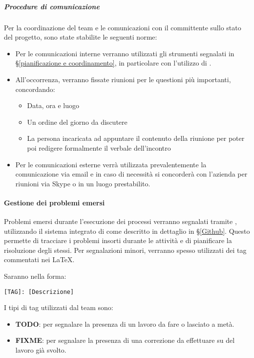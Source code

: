 			\subparagraph{Procedure di comunicazione}
			Per la coordinazione del team e le comunicazioni con il committente sullo stato del progetto, sono state stabilite le seguenti norme:
			\begin{itemize}
				\item Per le comunicazioni interne verranno utilizzati gli strumenti segnalati in \S\ref{pianificazione e coordinamento}, in particolare con l'utilizzo di .
				\item All'occorrenza, verranno fissate riunioni per le questioni più importanti, concordando:
					\begin{itemize}
						\item Data, ora e luogo
						\item Un ordine del giorno da discutere
						\item La persona incaricata ad appuntare il contenuto della riunione per poter poi redigere formalmente il verbale dell'incontro
					\end{itemize}
				\item Per le comunicazioni esterne verrà utilizzata prevalentemente la comunicazione via email e in caso di necessità si concorderà con l'azienda per riunioni via Skype o in un luogo prestabilito. %
			\end{itemize}


    		\paragraph{Gestione dei problemi emersi}
			Problemi emersi durante l'esecuzione dei processi verranno segnalati tramite , utilizzando il sistema integrato di  come descritto in dettaglio in \S\ref{Github}. Questo permette di tracciare i problemi insorti durante le attività e di pianificare la risoluzione degli stessi.
			Per segnalazioni minori, verranno spesso utilizzati dei tag commentati nei  \LaTeX.
			\begin{samepage}
				Saranno nella forma:
				\begin{center}
					\texttt{[TAG]: [Descrizione]}
				\end{center}
			\end{samepage}
			I tipi di tag utilizzati dal team sono:
			\begin{itemize}
				\item \textbf{TODO}: per segnalare la presenza di un lavoro da fare o lasciato a metà.
				\item \textbf{FIXME}: per segnalare la presenza di una correzione da effettuare su del lavoro già svolto.
			\end{itemize}

